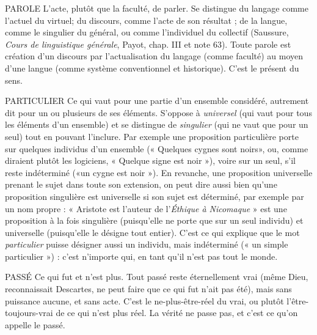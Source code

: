 PAROLE L'acte, plutôt que la faculté, de parler. Se distingue du langage
comme l'actuel du virtuel; du discours, comme l’acte de son
résultat ; de la langue, comme le singulier du général, ou comme l’individuel
du collectif (Saussure, {\it Cours de linguistique générale}, Payot, chap. III et note 63).
Toute parole est création d’un discours par l’actualisation du langage (comme
faculté) au moyen d’une langue (comme système conventionnel et historique).
C’est le présent du sens.

PARTICULIER Ce qui vaut pour une partie d’un ensemble considéré, autrement
dit pour un ou plusieurs de ses éléments. S’oppose à
{\it universel} (qui vaut pour tous les éléments d’un ensemble) et se distingue de {\it singulier}
(qui ne vaut que pour un seul) tout en pouvant l’inclure. Par exemple
une proposition particulière porte sur quelques individus d’un ensemble
(« Quelques cygnes sont noirs», ou, comme diraient plutôt les logiciens,
« Quelque signe est noir »), voire sur un seul, s’il reste indéterminé («un cygne
est noir »). En revanche, une proposition universelle prenant le sujet dans toute
son extension, on peut dire aussi bien qu’une proposition singulière est universelle
si son sujet est déterminé, par exemple par un nom propre : « Aristote est
l’auteur de l'{\it Éthique à Nicomaque} » est une proposition à la fois singulière
(puisqu'elle ne porte que sur un seul individu) et universelle (puisqu’elle le
désigne tout entier). C’est ce qui explique que le mot {\it particulier} puisse désigner
aussi un individu, mais indéterminé (« un simple particulier ») : c’est n'importe
qui, en tant qu'il n’est pas tout le monde.

PASSÉ Ce qui fut et n’est plus. Tout passé reste éternellement vrai (même
Dieu, reconnaissait Descartes, ne peut faire que ce qui fut n’ait pas
été), mais sans puissance aucune, et sans acte. C’est le ne-plus-être-réel du vrai,
ou plutôt l’être-toujours-vrai de ce qui n’est plus réel. La vérité ne passe pas, et
c'est ce qu'on appelle le passé.

